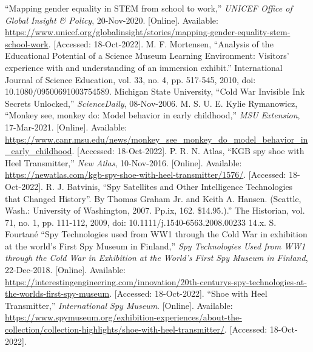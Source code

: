 \documentclass[conference]{IEEEtran}
\begin{document}
\begin{thebibliography}{00}
 “Mapping gender equality in STEM from school to work,” \textit{UNICEF Office of Global Insight \& Policy}, 20-Nov-2020. [Online]. Available: \href{https://www.unicef.org/globalinsight/stories/mapping-gender-equality-stem-school-work}{https://www.unicef.org/globalinsight/stories/mapping-gender-equality-stem-school-work}. [Accessed: 18-Oct-2022].
 M. F. Mortensen, “Analysis of the Educational Potential of a Science Museum Learning Environment: Visitors’ experience with and understanding of an immersion exhibit.”
 International Journal of Science Education, vol. 33, no. 4, pp. 517-545, 2010, doi: 10.1080/09500691003754589.
 Michigan State University, “Cold War Invisible Ink Secrets Unlocked,”  \textit{ScienceDaily}, 08-Nov-2006.
 M. S. U. E. Kylie Rymanowicz, “Monkey see, monkey do: Model behavior in early childhood,” \textit{MSU Extension}, 17-Mar-2021. [Online]. Available: \href{https://www.canr.msu.edu/news/monkey\_see\_monkey\_do\_model\_behavior\_in\_early\_childhood}{https://www.canr.msu.edu/news/monkey\_see\_monkey\_do\_model\_behavior\_in\_early\_childhood}. [Accessed: 18-Oct-2022].
 P. R. N. Atlas, “KGB spy shoe with Heel Transmitter,” \textit{New Atlas}, 10-Nov-2016. [Online]. Available: \href{https://newatlas.com/kgb-spy-shoe-with-heel-transmitter/1576/}{https://newatlas.com/kgb-spy-shoe-with-heel-transmitter/1576/}. [Accessed: 18-Oct-2022].
 R. J. Batvinis, “Spy Satellites and Other Intelligence Technologies that Changed History”. By Thomas Graham Jr. and Keith A. Hansen. (Seattle, Wash.: University of Washington, 2007. Pp.ix, 162. \$14.95.).” The Historian, vol. 71, no. 1, pp. 111-112, 2009, doi: 10.1111/j.1540-6563.2008.00233 14.x.
 S. Fourtané “Spy Technologies used from WW1 through the Cold War in exhibition at the world's First Spy Museum in Finland,” \textit{Spy Technologies Used from WW1 through the Cold War in Exhibition at the World's First Spy Museum in Finland}, 22-Dec-2018. [Online]. Available: \href{https://interestingengineering.com/innovation/20th-centurys-spy-technologies-at-the-worlds-first-spy-museum}{https://interestingengineering.com/innovation/20th-centurys-spy-technologies-at-the-worlds-first-spy-museum}. [Accessed: 18-Oct-2022].
 “Shoe with Heel Transmitter,” \textit{International Spy Museum}. [Online]. Available: \href{https://www.spymuseum.org/exhibition-experiences/about-the-collection/collection-highlights/shoe-with-heel-transmitter/}{https://www.spymuseum.org/exhibition-experiences/about-the-collection/collection-highlights/shoe-with-heel-transmitter/}. [Accessed: 18-Oct-2022].

\end{thebibliography}
\end{document}
